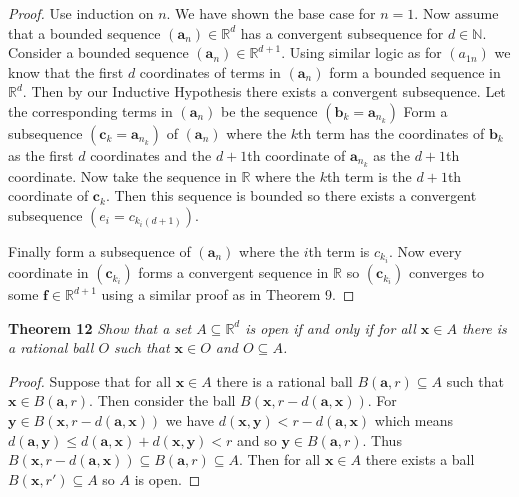 \documentclass{article}
\begin{document}
\begin{flushleft}
\begin{proof}
Use induction on $n$. We have shown the base case for $n=1$. Now assume that a bounded sequence $(\mathbf{a}_n) \in \mathbb{R}^d$ has a convergent subsequence for $d \in \mathbb{N}$. Consider a bounded sequence $(\mathbf{a}_n) \in \mathbb{R}^{d+1}$. Using similar logic as for $(a_{1n})$ we know that the first $d$ coordinates of terms in $(\mathbf{a}_n)$ form a bounded sequence in $\mathbb{R}^d$. Then by our Inductive Hypothesis there exists a convergent subsequence. Let the corresponding terms in $(\mathbf{a}_n)$ be the sequence $(\mathbf{b}_k = \mathbf{a}_{n_k})$  Form a subsequence $(\mathbf{c}_k = \mathbf{a}_{n_k})$ of $(\mathbf{a}_n)$ where the $k$th term has the coordinates of $\mathbf{b}_k$ as the first $d$ coordinates and the $d+1$th coordinate of $\mathbf{a}_{n_k}$ as the $d+1$th coordinate. Now take the sequence in $\mathbb{R}$ where the $k$th term is the $d+1$th coordinate of $\mathbf{c}_k$. Then this sequence is bounded so there exists a convergent subsequence $(e_i = c_{k_i (d+1)})$.\newline

Finally form a subsequence of $(\mathbf{a}_n)$ where the $i$th term is $c_{k_i}$. Now every coordinate in $(\mathbf{c}_{k_i})$ forms a convergent sequence in $\mathbb{R}$ so $(\mathbf{c}_{k_i})$ converges to some $\mathbf{f} \in \mathbb{R}^{d+1}$ using a similar proof as in Theorem 9.
\end{proof}

\textbf{Theorem 12}
\textsl{Show that a set $A \subseteq \mathbb{R}^d$ is open if and only if for all $\mathbf{x} \in A$ there is a rational ball $O$ such that $\mathbf{x} \in O$ and $O \subseteq A$.}
\begin{proof}
Suppose that for all $\mathbf{x} \in A$ there is a rational ball $B(\mathbf{a}, r) \subseteq A$ such that $\mathbf{x} \in B(\mathbf{a}, r)$. Then consider the ball $B(\mathbf{x}, r-d(\mathbf{a}, \mathbf{x}))$. For $\mathbf{y} \in B(\mathbf{x}, r-d(\mathbf{a}, \mathbf{x}))$ we have $d(\mathbf{x}, \mathbf{y}) < r-d(\mathbf{a}, \mathbf{x})$ which means $d(\mathbf{a}, \mathbf{y}) \leq d(\mathbf{a}, \mathbf{x}) + d(\mathbf{x}, \mathbf{y}) < r$ and so $\mathbf{y} \in B(\mathbf{a}, r)$. Thus $B(\mathbf{x}, r-d(\mathbf{a}, \mathbf{x})) \subseteq B(\mathbf{a}, r) \subseteq A$. Then for all $\mathbf{x} \in A$ there exists a ball $B(\mathbf{x}, r') \subseteq A$ so $A$ is open.\newline


\end{proof}
\end{flushleft}
\end{document}
